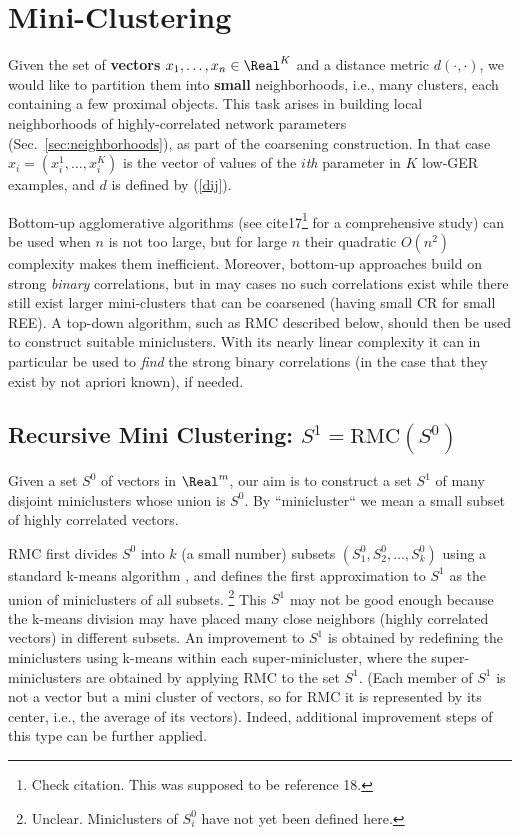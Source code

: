 \documentclass{article} %
\begin{document}
\section{Mini-Clustering}
\label{sec:miniclustering}
Given the set of \textbf{vectors} $x_1, \dots, x_n \in \Real^K$ and a distance metric $d(\cdot, \cdot)$, we would like to partition them into \textbf{small} neighborhoods, i.e., many clusters, each containing a few proximal objects. This task arises in building local neighborhoods of highly-correlated network parameters (Sec.~\ref{sec:neighborhoods}), as part of the coarsening construction. In that case $x_i=(x^1_i,\dots,x^K_i)$ is the vector of values of the $i${\it th} parameter in $K$ low-GER examples, and $d$ is defined by (\ref{dij}).

Bottom-up agglomerative algorithms (see \cite{kmeans}cite{17}\footnote{Check citation. This was supposed to be reference 18.} for a comprehensive study) can be used when $n$ is not too large, but for large $n$ their quadratic $O(n^2)$ complexity makes them inefficient. Moreover, bottom-up approaches build on strong {\it binary} correlations, but in may cases no such correlations exist while there still exist larger mini-clusters that can be coarsened (having small CR for small REE). A top-down algorithm, such as RMC described below, should then be used to construct suitable miniclusters. With its nearly linear complexity it can in particular be used to {\it find} the strong binary correlations (in the case that they exist by not apriori known), if needed.

\subsection{Recursive Mini Clustering: $S^1 = \text{RMC}(S^0)$}
\label{sec:G.1}
Given a set $S^0$ of vectors in $\Real^m$, our aim is to construct a set $S^1$ of many disjoint miniclusters whose union is $S^0$. By ``minicluster`` we mean a small subset of highly correlated vectors.

RMC first divides $S^0$ into $k$ (a small number) subsets $(S^0_1,S^0_2,\dots,S^0_k)$ using a standard k-means algorithm \cite{kmeans}, and defines the first approximation to $S^1$ as the union of miniclusters of all subsets. \footnote{Unclear. Miniclusters of $S^0_i$ have not yet been defined here.} This $S^1$ may not be good enough because the k-means division may have placed many close neighbors (highly correlated vectors) in different subsets. An improvement to $S^1$ is obtained by redefining the miniclusters using k-means within each super-minicluster, where the super-miniclusters are obtained by applying RMC to the set $S^1$. (Each member of $S^1$ is not a vector but a mini cluster of vectors, so for RMC it is represented by its center, i.e., the average of its vectors). Indeed, additional improvement steps of this type can be further applied.
\end{document}
